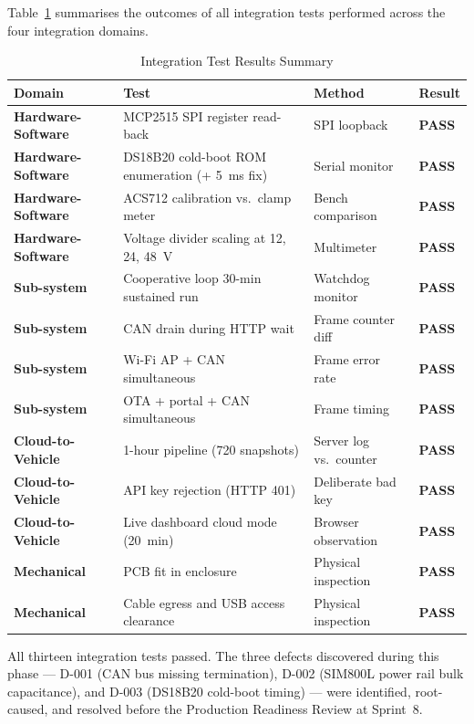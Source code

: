 Table~\ref{tab:integration-results} summarises the outcomes of all integration tests performed across the four integration domains.

\begin{table}[H]
\centering
\caption{Integration Test Results Summary}\label{tab:integration-results}
\small
\begin{tabular}{>{\bfseries}p{3.2cm} p{4.8cm} p{2.6cm} p{1.5cm}}
\toprule
Domain & Test & Method & Result \\
\midrule
Hardware-Software & MCP2515 SPI register read-back & SPI loopback & \textbf{PASS} \\
Hardware-Software & DS18B20 cold-boot ROM enumeration (+ 5~ms fix) & Serial monitor & \textbf{PASS} \\
Hardware-Software & ACS712 calibration vs.\ clamp meter & Bench comparison & \textbf{PASS} \\
Hardware-Software & Voltage divider scaling at 12, 24, 48~V & Multimeter & \textbf{PASS} \\
Sub-system & Cooperative loop 30-min sustained run & Watchdog monitor & \textbf{PASS} \\
Sub-system & CAN drain during HTTP wait & Frame counter diff & \textbf{PASS} \\
Sub-system & Wi-Fi AP + CAN simultaneous & Frame error rate & \textbf{PASS} \\
Sub-system & OTA + portal + CAN simultaneous & Frame timing & \textbf{PASS} \\
Cloud-to-Vehicle & 1-hour pipeline (720 snapshots) & Server log vs.\ counter & \textbf{PASS} \\
Cloud-to-Vehicle & API key rejection (HTTP 401) & Deliberate bad key & \textbf{PASS} \\
Cloud-to-Vehicle & Live dashboard cloud mode (20~min) & Browser observation & \textbf{PASS} \\
Mechanical & PCB fit in enclosure & Physical inspection & \textbf{PASS} \\
Mechanical & Cable egress and USB access clearance & Physical inspection & \textbf{PASS} \\
\bottomrule
\end{tabular}
\end{table}

All thirteen integration tests passed. The three defects discovered during this phase --- D-001 (CAN bus missing termination), D-002 (SIM800L power rail bulk capacitance), and D-003 (DS18B20 cold-boot timing) --- were identified, root-caused, and resolved before the Production Readiness Review at Sprint~8.

